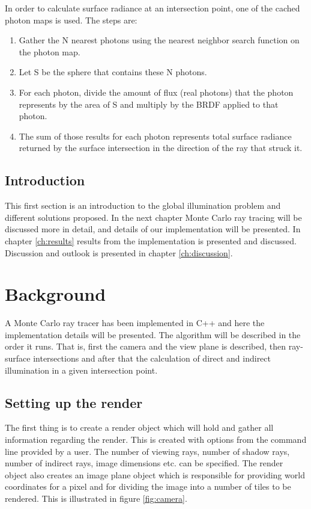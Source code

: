 \documentclass[a4paper]{report}
\begin{document}
In order to calculate surface radiance at an intersection point, one
of the cached photon maps is used. The steps are:

\begin{enumerate}
\item{Gather the N nearest photons using the nearest neighbor search function on the photon map.}
\item{Let S be the sphere that contains these N photons.}
\item {For each photon, divide the amount of flux (real photons) that
    the photon represents by the area of S and multiply by the BRDF applied to that photon.}
\item{The sum of those results for each photon represents total
    surface radiance returned by the surface intersection in the
    direction of the ray that struck it.}
\end{enumerate}

\section{Introduction}
This first section is an introduction to the global illumination problem and different
solutions proposed. In the next chapter Monte Carlo ray tracing will be
discussed more in detail, and details of our implementation will be
presented. In chapter \ref{ch:results} results from the implementation
is presented and discussed. Discussion and outlook is presented in chapter \ref{ch:discussion}. 

\chapter{Background}

A Monte Carlo ray tracer has been implemented in C++ and here the
implementation details will be presented. The algorithm will be
described in the order it runs. That is, first the camera and the view
plane is described, then ray-surface intersections and after that the
calculation of direct and indirect illumination in a given
intersection point.

\section{Setting up the render}

The first thing is to create a render object which will hold and
gather all information regarding the render. This is created with
options from the command line provided by a user. The number of
viewing rays, number of shadow rays, number of indirect rays, image
dimensions etc. can be specified. The render object also creates an
image plane object which is responsible for providing world
coordinates for a pixel and for dividing the image into a number of
tiles to be rendered. This is illustrated in figure
\ref{fig:camera}.
\end{document}
